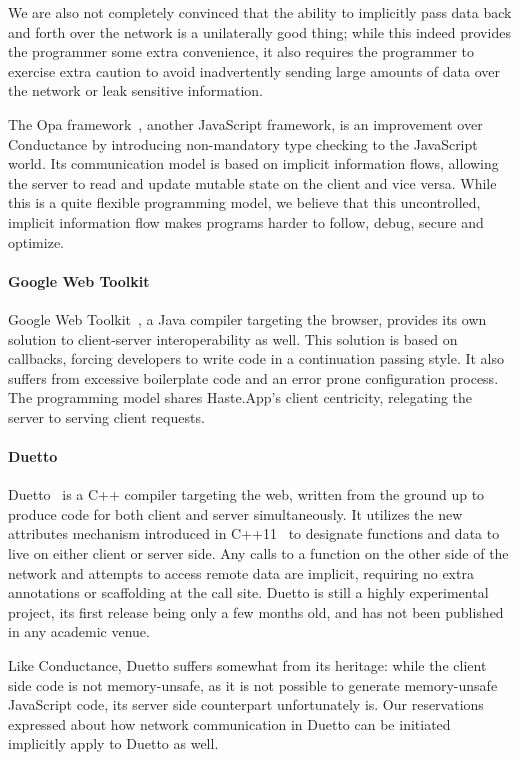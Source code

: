 \documentclass[preprint]{sigplanconf}
\begin{document}
We are also not completely convinced that the ability to implicitly pass data
back and forth over the network is a unilaterally good thing; while this indeed
provides the programmer some extra convenience, it also requires the programmer
to exercise extra caution to avoid inadvertently sending large amounts of data
over the network or leak sensitive information.

The Opa framework\ \cite{opa}, another JavaScript framework, is an improvement
over Conductance by introducing non-mandatory type checking to the JavaScript
world. Its communication model is based on implicit information flows, allowing
the server to read and update mutable state on the client and vice versa.
While this is a quite flexible programming model, we believe that this
uncontrolled, implicit information flow makes programs harder to follow, debug,
secure and optimize.

\paragraph{Google Web Toolkit} Google Web Toolkit\ \cite{gwt}, a Java
compiler targeting the browser, provides its own solution to client-server
interoperability as well. This solution is based on callbacks, forcing
developers to write code in a continuation passing style. It also suffers
from excessive boilerplate code and an error prone configuration process.
The programming model shares Haste.App's client centricity, relegating the
server to serving client requests.

\paragraph{Duetto} Duetto\ \cite{duetto} is a C++ compiler targeting the web,
written from the ground up to produce code for both client and server
simultaneously.
It utilizes the new attributes mechanism introduced in C++11\ \cite{sepples11}
to designate functions and data to live on either client or server side.
Any calls to a function on the other side of the network and attempts to access
remote data are implicit, requiring no extra annotations or scaffolding at the
call site. Duetto is still a highly experimental project, its first release
being only a few months old, and has not been published in any academic venue.

Like Conductance, Duetto suffers somewhat from its heritage: while the
client side code is not memory-unsafe, as it is not possible to generate
memory-unsafe JavaScript code, its server side counterpart unfortunately is.
Our reservations expressed about how network communication in Duetto can be
initiated implicitly apply to Duetto as well.
\end{document}
